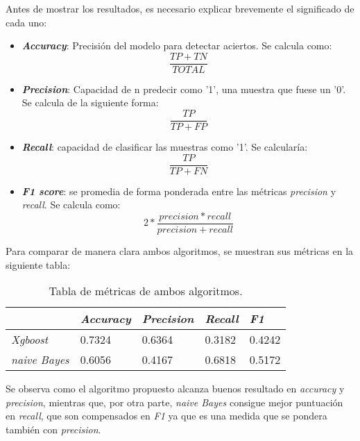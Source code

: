 Antes de mostrar los resultados, es necesario explicar brevemente el significado de cada uno:
\begin{itemize}
	\item \textbf{\textit{Accuracy}}: Precisión del modelo para detectar aciertos. Se calcula como:
	\begin{equation}
	\frac{TP + TN}{TOTAL}
	\end{equation} 
	\item \textbf{\textit{Precision}}: Capacidad de n predecir como '1', una muestra que fuese un '0'. Se calcula de la siguiente forma:
	\begin{equation}
	\frac{TP}{TP + FP}
	\end{equation}
	\item \textbf{\textit{Recall}}: capacidad de clasificar las muestras como '1'. Se calcularía:
	\begin{equation}
	\frac{TP}{TP + FN}
	\end{equation}
	\item \textbf{\textit{F1 score}}: se promedia de forma ponderada entre las métricas \textit{precision} y \textit{recall}. Se calcula como:
	\begin{equation}
	2 * \frac{precision * recall}{precision + recall}
	\end{equation}
\end{itemize}

Para comparar de manera clara ambos algoritmos, se muestran sus métricas en la siguiente tabla:

\begin{table}[htb]
	\begin{center}
		\begin{tabular}{|l|l|l|l|l|}
			\hline
			& \textit{Accuracy} & \textit{Precision} & \textit{Recall} & \textit{F1} \\
			\hline 
			\textit{Xgboost} & 0.7324 & 0.6364 & 0.3182 &  0.4242 \\ \hline
			\textit{naive Bayes} & 0.6056 & 0.4167 & 0.6818 & 0.5172 \\ \hline
			
		\end{tabular}
		\caption{Tabla de métricas de ambos algoritmos.}
		\label{tabla:results}
	\end{center}
\end{table}

Se observa como el algoritmo propuesto alcanza buenos resultado en \textit{accuracy} y \textit{precision}, mientras que, por otra parte, \textit{naive Bayes} consigue mejor puntuación en \textit{recall}, que son compensados en \textit{F1} ya que es una medida que se pondera también con \textit{precision}.

